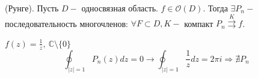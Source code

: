  (Рунге). Пусть $D -$ односвязная область. $f \in \mathcal{O}(D)$. Тогда $\exists P_n -$ последовательность многочленов: $\forall F \subset D, K -$ компакт $P_n \overset{K}{\rightrightarrows} f$.

 $f(z) = \frac{1}{z}, \ \mathbb{C} \setminus \{0\}$
\[\oint_{|z|=1} P_n(z) dz = 0 \to \oint_{|z|=1} \frac{1}{z} dz = 2\pi i \Rightarrow \nexists P_n\]
